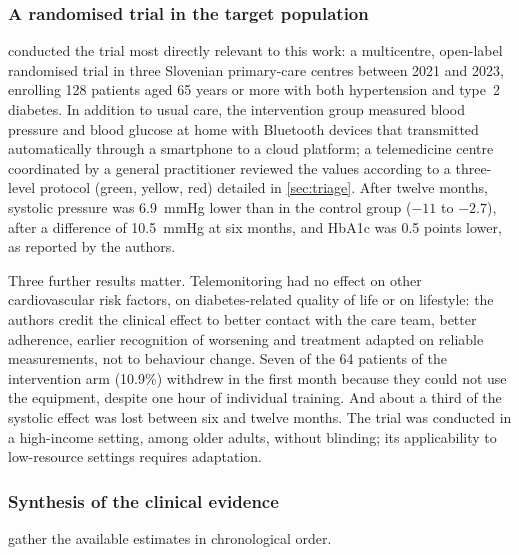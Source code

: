 \subsubsection{A randomised trial in the target population}\label{sec:mihevc}\label{sec:mechanism}\label{sec:feasibility}

\Textcite{mihevc2025} conducted the trial most directly relevant to this work: a multicentre, open-label randomised trial in three Slovenian primary-care centres between 2021 and 2023, enrolling 128 patients aged 65 years or more with both hypertension and type~2 diabetes. In addition to usual care, the intervention group measured blood pressure and blood glucose at home with Bluetooth devices that transmitted automatically through a smartphone to a cloud platform; a telemedicine centre coordinated by a general practitioner reviewed the values according to a three-level protocol (green, yellow, red) detailed in \cref{sec:triage}. After twelve months, systolic pressure was 6.9~mmHg lower than in the control group ($-11$ to $-2.7$), after a difference of 10.5~mmHg at six months, and HbA1c was 0.5 points lower, as reported by the authors.

Three further results matter. Telemonitoring had no effect on other cardiovascular risk factors, on diabetes-related quality of life or on lifestyle: the authors credit the clinical effect to better contact with the care team, better adherence, earlier recognition of worsening and treatment adapted on reliable measurements, not to behaviour change. Seven of the 64 patients of the intervention arm (10.9\%) withdrew in the first month because they could not use the equipment, despite one hour of individual training. And about a third of the systolic effect was lost between six and twelve months. The trial was conducted in a high-income setting, among older adults, without blinding; its applicability to low-resource settings requires adaptation.

\subsubsection{Synthesis of the clinical evidence}\label{sec:consolidated}

 gather the available estimates in chronological order.

